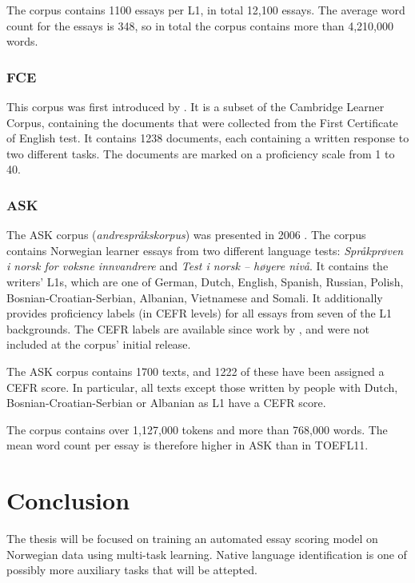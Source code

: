 The corpus contains 1100 essays per L1, in total 12,100 essays. The average
word count for the essays is 348, so in total the corpus contains more than
4,210,000 words.


\subsubsection{FCE}

This corpus was first introduced by \textcite{yannakoudakis2011new}. It is a
subset of the Cambridge Learner Corpus, containing the documents that were
collected from the First Certificate of English test. It contains 1238
documents, each containing a written response to two different tasks. The
documents are marked on a proficiency scale from 1 to 40.


\subsubsection{ASK}

The ASK corpus (\emph{andrespråkskorpus}) was presented in 2006
\autocite{tenfjord06}. The corpus contains Norwegian learner essays from two
different language tests: \emph{Språkprøven i norsk for voksne innvandrere}
and \emph{Test i norsk – høyere nivå}. It contains the writers' L1s, which
are one of German, Dutch, English, Spanish, Russian, Polish,
Bosnian-Croatian-Serbian, Albanian, Vietnamese and Somali. It additionally
provides proficiency labels (in CEFR levels) for all essays from seven of the
L1 backgrounds. The CEFR labels are available since work by
\textcite{carlsen2012proficiency}, and were not included at the corpus'
initial release.

The ASK corpus contains 1700 texts, and 1222 of these have been assigned a
CEFR score. In particular, all texts except those written by people with
Dutch, Bosnian-Croatian-Serbian or Albanian as L1 have a CEFR score.

The corpus contains over 1,127,000 tokens and more than 768,000 words. The
mean word count per essay is therefore higher in ASK than in TOEFL11.


\section{Conclusion}

The thesis will be focused on training an automated essay scoring model on
Norwegian data using multi-task learning. Native language identification is
one of possibly more auxiliary tasks that will be attepted.
